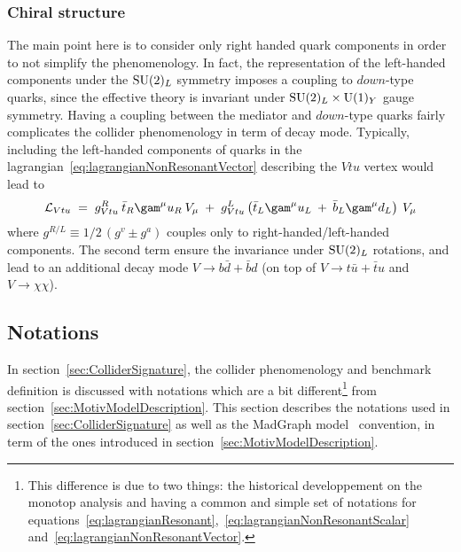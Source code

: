 
\subsubsection{Chiral structure}
\label{sec:chiralstructure}

The main point here is to consider only right handed quark components in order to not simplify the phenomenology. In fact, the representation of the left-handed 
components under the $\mathrm{SU}(2)_{L}$ symmetry imposes a coupling to $down$-type quarks, since the effective theory is invariant under $\mathrm{SU}(2)_{L} \times \mathrm{U}(1)_{Y}$ gauge symmetry. Having a coupling between
the mediator and $down$-type quarks fairly complicates the collider phenomenology in term of decay mode. Typically, including 
the left-handed components of quarks in the lagrangian~\eqref{eq:lagrangianNonResonantVector} describing the $Vtu$ vertex would lead to 
\begin{equation}
 \Lagr_{Vtu} \; = \;  g^{R}_{Vtu} \: \bar{t}_{R}\gam^{\mu}u_R \: V_{\mu} \; + \; g^{L}_{Vtu} \left(   \bar{t}_{L}\gam^{\mu}u_L \: + \:  \bar{b}_{L}\gam^{\mu}d_L \right) \: V_{\mu}
\end{equation}
where $g^{R/L} \equiv 1/2 \, (g^{v} \pm g^{a})$ couples only to right-handed/left-handed components. The second term ensure the invariance under $\mathrm{SU}(2)_{L}$ rotations, and lead to an additional decay mode $V \to b\bar{d} + \bar{b}d$ (on top of $V \to t\bar{u} + \bar{t}u$ and $V \to \chi\chi$). 
 
\subsection{Notations}

In section~\ref{sec:ColliderSignature}, the collider phenomenology and benchmark definition is discussed with notations which are 
a bit different\footnote{This difference is due to two things: the historical developpement on the monotop analysis and having a 
  common and simple set of notations for equations~\eqref{eq:lagrangianResonant},~\eqref{eq:lagrangianNonResonantScalar} and~\eqref{eq:lagrangianNonResonantVector}.} 
from section~\ref{sec:MotivModelDescription}. This section describes the notations used in section~\ref{sec:ColliderSignature} as well as 
the MadGraph model~\cite{MGmodel} convention, in term of the ones introduced in section~\ref{sec:MotivModelDescription}.

